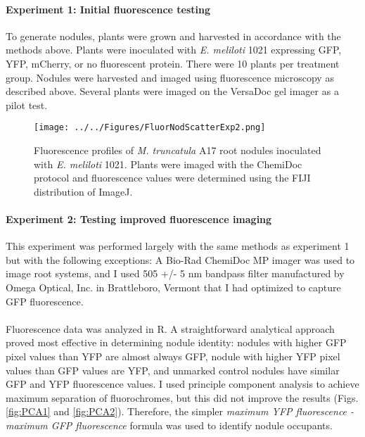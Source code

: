 \documentclass[12pt]{article}
\begin{document}
\begin{doublespace}
\paragraph{Experiment 1: Initial fluorescence testing} 
To generate nodules, plants were grown and harvested in accordance with the methods above. Plants were inoculated with \textit{E. meliloti} 1021 expressing GFP, YFP, mCherry, or no fluorescent protein. There were 10 plants per treatment group. Nodules were harvested and imaged using fluorescence microscopy as described above. Several plants were imaged on the VersaDoc gel imager as a pilot test.
		\begin{figure}[h!]
		\centering
		\texttt{[image: ../../Figures/FluorNodScatterExp2.png]}
		\caption{Fluorescence profiles of \textit{M. truncatula} A17 root nodules inoculated with \textit{E. meliloti} 1021. Plants were imaged with the ChemiDoc protocol and fluorescence values were determined using the FIJI distribution of ImageJ.}
		\label{fig:scatter}
		\end{figure}
		
	\paragraph{Experiment 2: Testing improved fluorescence imaging}
This experiment was performed largely with the same methods as experiment 1 but with the following exceptions: A Bio-Rad ChemiDoc MP imager was used to image root systems, and I used 505 +/- 5 nm bandpass filter manufactured by Omega Optical, Inc. in Brattleboro, Vermont that I had optimized to capture GFP fluorescence. 
	\paragraph{} %
Fluorescence data was analyzed in R. A straightforward analytical approach proved most effective in determining nodule identity: nodules with higher GFP pixel values than YFP are almost always GFP, nodule with higher YFP pixel values than GFP values are YFP, and unmarked control nodules have similar GFP and YFP fluorescence values. I used principle component analysis to achieve maximum separation of fluorochromes, but this did not improve the results (Figs. \ref{fig:PCA1} and \ref{fig:PCA2}). Therefore, the simpler \textit{maximum YFP fluorescence - maximum GFP fluorescence} formula was used to identify nodule occupants. 

\end{doublespace}
\end{document}
